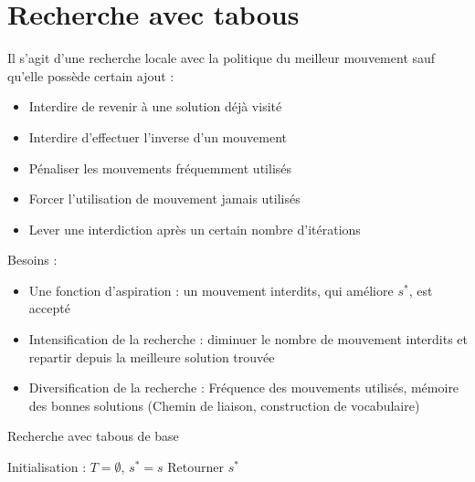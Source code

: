 \documentclass[11pt,a4paper]{report}
\begin{document}
\chapter{Recherche avec tabous}

Il s'agit d'une recherche locale avec la politique du meilleur mouvement sauf qu'elle possède certain ajout :
\begin{itemize}
    \item Interdire de revenir à une solution déjà visité
    \item Interdire d'effectuer l'inverse d'un mouvement
    \item Pénaliser les mouvements fréquemment utilisés
    \item Forcer l'utilisation de mouvement jamais utilisés
    \item Lever une interdiction après un certain nombre d'itérations
\end{itemize}

Besoins :
\begin{itemize}
    \item Une fonction d'aspiration : un mouvement interdits, qui améliore $s^*$, est accepté
    \item Intensification de la recherche : diminuer le nombre de mouvement interdits et repartir depuis la meilleure solution trouvée
    \item Diversification de la recherche : Fréquence des mouvements utilisés, mémoire des bonnes solutions (Chemin de liaison, construction de vocabulaire)
\end{itemize}

\begin{algorithm}[H]
\caption{Recherche avec tabous de base}
Initialisation : $T = \emptyset$, $s^* = s$\;
Retourner $s^*$\;
\end{algorithm}
\end{document}

